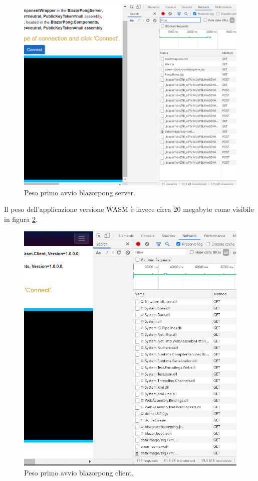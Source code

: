\begin{figure}[H]
	\centerline{\includegraphics[scale=0.5]{figure/blazorpongServerWeigth.PNG}}
	\caption{Peso primo avvio blazorpong server.}
	\label{fig:blazorpongServerWeigth}
\end{figure}

Il peso dell'applicazione versione WASM \`e invece circa 20 megabyte come visibile in figura \ref{fig:blazorpongClientWeigth}.

\begin{figure}[H]
	\centerline{\includegraphics[scale=0.5]{figure/blazorpongClientWeigth.PNG}}
	\caption{Peso primo avvio blazorpong client.}
	\label{fig:blazorpongClientWeigth}
\end{figure}